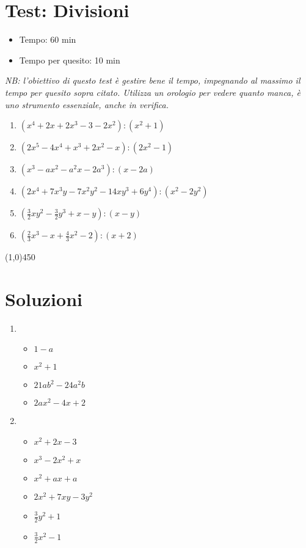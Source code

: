 \documentclass[a4paper]{article}
\begin{document}
\section{Test: Divisioni }
\begin{itemize}
	\item Tempo: 60 min
	\item Tempo per quesito: 10 min 
\end{itemize}
\textit{NB: l'obiettivo di questo test è gestire bene il tempo, impegnando al massimo il tempo per quesito sopra citato. Utilizza un orologio per vedere quanto manca, è uno strumento essenziale, anche in verifica.}
\begin{enumerate}
	\item $(x^4+2x+2x^3-3-2x^2):(x^2+1)$
	\item $(2x^5-4x^4+x^3+2x^2-x):(2x^2-1)$
	\item $(x^3-ax^2-a^2x-2a^3):(x-2a)$
	\item $(2x^4+7x^3y-7x^2y^2-14xy^3+6y^4):(x^2-2y^2)$
	\item $(\frac{3}{2}xy^2-\frac{3}{2}y^3+x-y):(x-y)$
	\item $(\frac{2}{3}x^3-x+\frac{4}{3}x^2-2):(x+2)$
\end{enumerate}
\begin{center}
	\line(1,0){450}
\end{center}





















\twocolumn
\section{Soluzioni}
\begin{enumerate}
\item 	\begin{itemize}
		\item $1-a$
		\item $x^2+1$
		\item $21ab^2-24a^2b$
		\item $2ax^2-4x+2$
	\end{itemize}
\item 	\begin{itemize}
		\item $x^2+2x-3$
		\item $x^3-2x^2+x$
		\item $x^2+ax+a$
		\item $2x^2+7xy-3y^2$
		\item $\frac{3}{2}y^2+1$
		\item $\frac{3}{2}x^2-1$
\end{itemize}
\end{enumerate}
\end{document}
